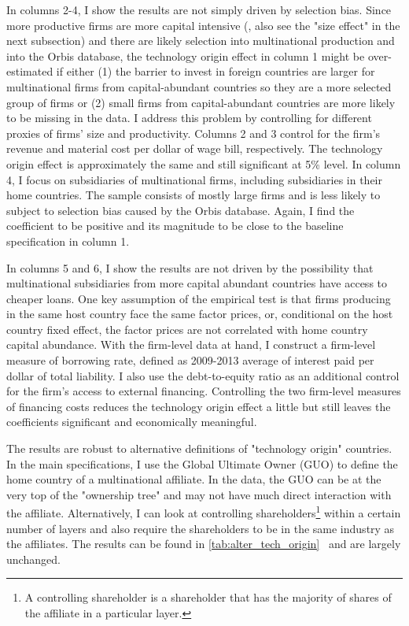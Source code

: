 \documentclass[notitlepage,11pt]{article}%
\begin{document}
In columns 2-4, I show the results are not simply driven by selection bias.
Since more productive firms are more capital intensive
(\cite{bernard_firms_2007}, also see the "size effect" in the next subsection)
and there are likely selection into multinational production and into the
Orbis database, the technology origin effect in column 1 might be
over-estimated if either (1) the barrier to invest in foreign countries are
larger for multinational firms from capital-abundant countries so they are a
more selected group of firms or (2) small firms from capital-abundant
countries are more likely to be missing in the data. I address this problem by
controlling for different proxies of firms' size and productivity. Columns 2
and 3 control for the firm's revenue and material cost per dollar of wage
bill, respectively. The technology origin effect is approximately the same and
still significant at 5\% level. In column 4, I focus on subsidiaries of
multinational firms, including subsidiaries in their home countries. The
sample consists of mostly large firms and is less likely to subject to
selection bias caused by the Orbis database. Again, I find the coefficient to
be positive and its magnitude to be close to the baseline specification in
column 1.

In columns 5 and 6, I show the results are not driven by the possibility that
multinational subsidiaries from more capital abundant countries have access to
cheaper loans. One key assumption of the empirical test is that firms
producing in the same host country face the same factor prices, or,
conditional on the host country fixed effect, the factor prices are not
correlated with home country capital abundance. With the firm-level data at
hand, I construct a firm-level measure of borrowing rate, defined as 2009-2013
average of interest paid per dollar of total liability. I also use the
debt-to-equity ratio as an additional control for the firm's access to
external financing. Controlling the two firm-level measures of financing costs
reduces the technology origin effect a little but still leaves the
coefficients significant and economically meaningful.

The results are robust to alternative definitions of "technology origin"
countries. In the main specifications, I use the Global Ultimate Owner (GUO)
to define the home country of a multinational affiliate. In the data, the GUO
can be at the very top of the "ownership tree" and may not have much direct
interaction with the affiliate. Alternatively, I can look at controlling
shareholders\footnote{A controlling shareholder is a shareholder that has the
majority of shares of the affiliate in a particular layer.} within a certain
number of layers and also require the shareholders to be in the same industry
as the affiliates. The results can be found in \ref{tab:alter_tech_origin}%
\ and are largely unchanged.
\end{document}

